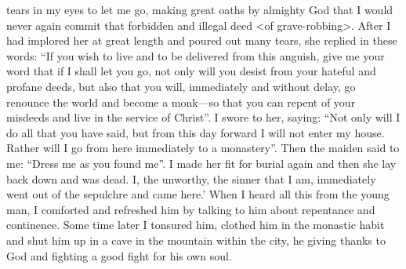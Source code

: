 tears in my eyes to let me go, making great oaths by almighty God
that I would never again commit that forbidden and illegal deed <of
grave-robbing>. After I had implored her at great length and
poured out many tears, she replied in these words: “If you wish to
live and to be delivered from this anguish, give me your word that
if I shall let you go, not only will you desist from your hateful and
profane deeds, but also that you will, immediately and without
delay, go renounce the world and become a monk—so that you can
repent of your misdeeds and live in the service of Christ”. I swore
to her, saying: “Not only will I do all that you have said, but from
this day forward I will not enter my house. Rather will I go from
here immediately to a monastery”. Then the maiden said to me:
“Dress me as you found me”. I made her fit for burial again and
then she lay back down and was dead. I, the unworthy, the sinner
that I am, immediately went out of the sepulchre and came here.'
When I heard all this from the young man, I comforted and
refreshed him by talking to him about repentance and continence.
Some time later I tonsured him, clothed him in the monastic habit
and shut him up in a cave in the mountain within the city, he giving
thanks to God and fighting a good fight for his own soul.

